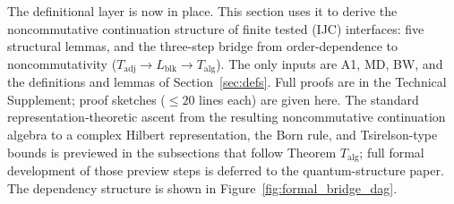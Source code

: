 \documentclass[11pt]{article}
\theoremstyle{remark}
\begin{document}
\noindent The definitional layer is now in place.  This section uses it to derive the noncommutative continuation structure of finite tested (IJC) interfaces: five structural lemmas, and the three-step bridge from order-dependence to noncommutativity ($T_{\mathrm{adj}} \to L_{\mathrm{blk}} \to T_{\mathrm{alg}}$).  The only inputs are A1, MD, BW, and the definitions and lemmas of Section~\ref{sec:defs}.  Full proofs are in the Technical Supplement; proof sketches ($\le 20$ lines each) are given here.  The standard representation-theoretic ascent from the resulting noncommutative continuation algebra to a complex Hilbert representation, the Born rule, and Tsirelson-type bounds is previewed in the subsections that follow Theorem $T_{\mathrm{alg}}$; full formal development of those preview steps is deferred to the quantum-structure paper.  The dependency structure is shown in Figure~\ref{fig:formal_bridge_dag}.
\end{document}
